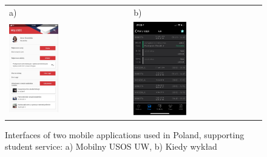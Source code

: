\begin{figure}[htb]
    \centering
    \begin{tabular}{@{}ll@{}}
        a) & b) \\
        \includegraphics[width=0.425\textwidth]{fig01/mobilny-usos.png} &
        \includegraphics[width=0.425\textwidth]{fig01/kiedy-wyklad.png} \\
    \end{tabular}
    \caption{Interfaces of two mobile applications used in Poland, supporting student service: a) Mobilny USOS UW, b) Kiedy wykład} \label{fig:similiar-solutions}
\end{figure}

